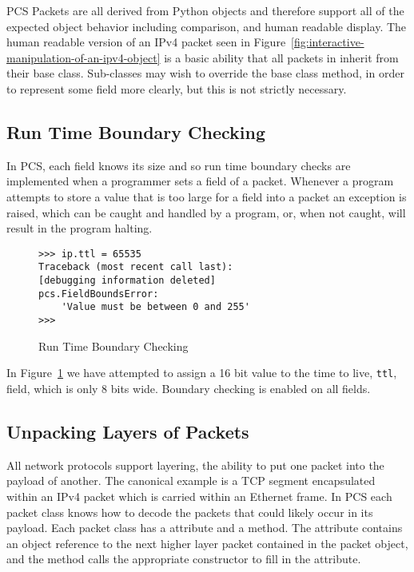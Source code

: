 \documentclass{sig-alternate-10pt}
\begin{document}
PCS Packets are all derived from Python objects and therefore support
all of the expected object behavior including comparison, and human
readable display.  The human readable version of an IPv4 packet seen
in Figure~\ref{fig:interactive-manipulation-of-an-ipv4-object} is a
basic ability that all packets in  inherit from their
base class.  Sub-classes may wish to override the base class method,
in order to represent some field more clearly, but this is not
strictly necessary.

\subsection{Run Time Boundary Checking}
\label{sec:run-time-boundary-checking}

In PCS, each field knows its size and so run time boundary checks are
implemented when a programmer sets a field of a packet.  Whenever a
program attempts to store a value that is too large for a field into a
packet an exception is raised, which can be caught and handled by a
program, or, when not caught, will result in the program halting.

\begin{figure}
  \centering
\begin{verbatim}
>>> ip.ttl = 65535
Traceback (most recent call last):
[debugging information deleted]
pcs.FieldBoundsError: 
    'Value must be between 0 and 255'
>>> 
\end{verbatim}
  \caption{Run Time Boundary Checking}
  \label{fig:run-time-boundary-checking}
\end{figure}

In Figure~\ref{fig:run-time-boundary-checking} we have attempted to
assign a 16 bit value to the time to live, \verb|ttl|, field, which is
only 8 bits wide.  Boundary checking is enabled on all fields.

\subsection{Unpacking Layers of Packets}
\label{sec:unpacking-layers-of-packets}

All network protocols support layering, the ability to put one packet
into the payload of another.  The canonical example is a TCP segment
encapsulated within an IPv4 packet which is carried within an Ethernet
frame.  In PCS each packet class knows how to decode the packets that
could likely occur in its payload.  Each packet class has a
 attribute and a  method.  The 
attribute contains an object reference to the next higher layer packet
contained in the packet object, and the  method 
calls the appropriate constructor to fill in the 
attribute.
\end{document}
